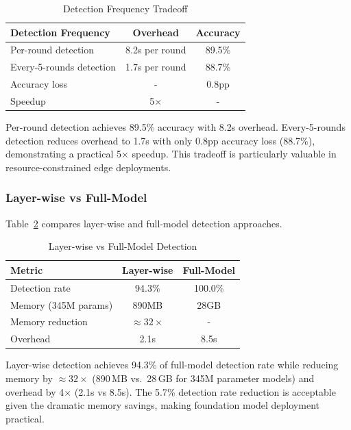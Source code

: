 \begin{table}[htbp]
\centering
\caption{Detection Frequency Tradeoff}
\label{tab:detection_frequency}
\begin{tabular}{|l|c|c|}
\hline
\textbf{Detection Frequency} & \textbf{Overhead} & \textbf{Accuracy} \\
\hline
Per-round detection & 8.2s per round & 89.5\% \\
Every-5-rounds detection & 1.7s per round & 88.7\% \\
\hline
Accuracy loss & - & 0.8pp \\
Speedup & 5$\times$ & - \\
\hline
\end{tabular}
\end{table}

Per-round detection achieves 89.5\% accuracy with 8.2s overhead. Every-5-rounds detection reduces overhead to 1.7s with only 0.8pp accuracy loss (88.7\%), demonstrating a practical 5$\times$ speedup. This tradeoff is particularly valuable in resource-constrained edge deployments.

\subsubsection{Layer-wise vs Full-Model}

Table~\ref{tab:layerwise_comparison} compares layer-wise and full-model detection approaches.

\begin{table}[htbp]
\centering
\caption{Layer-wise vs Full-Model Detection}
\label{tab:layerwise_comparison}
\begin{tabular}{|l|c|c|}
\hline
\textbf{Metric} & \textbf{Layer-wise} & \textbf{Full-Model} \\
\hline
Detection rate & 94.3\% & 100.0\% \\
Memory (345M params) & 890MB & 28GB \\
Memory reduction & ${\approx}32{\times}$ & - \\
Overhead & 2.1s & 8.5s \\
\hline
\end{tabular}
\end{table}

Layer-wise detection achieves 94.3\% of full-model detection rate while reducing memory by ${\approx}32{\times}$ (890\,MB vs.\ 28\,GB for 345M parameter models) and overhead by 4$\times$ (2.1s vs 8.5s). The 5.7\% detection rate reduction is acceptable given the dramatic memory savings, making foundation model deployment practical.

